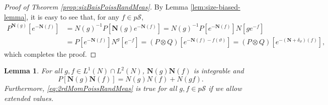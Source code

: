 \documentclass[UTF8]{pkuthss}
\theoremstyle{plain}
\newtheorem{lem}[thm]{Lemma}
\theoremstyle{definition}
\numberwithin{equation}{section}
\begin{document}
\begin{proof}[Proof of Theorem \ref{prop:sizBaisPoissRandMeas}]
	By Lemma \ref{lem:size-biased-lemma}, it is easy to see that, for any $f\in p\mathscr S$,
\begin{align}
	P^{\mathbf N(g)}[e^{-\mathbf N(f)}]
	&= N(g)^{-1} P[\mathbf N(g) e^{-\mathbf N(f)}]
	= N(g)^{-1} P[e^{-\mathbf N(f)}] N[ge^{-f}]\\
	&=  P[e^{-\mathbf N(f)}] N^g[e^{-f}]
	= (P\otimes Q)[e^{-\mathbf N(f) - f(\vartheta)}]
	= (P\otimes Q)[e^{-(\mathbf N + \delta_\vartheta)(f)}],
\end{align}
	which completes the proof.
\end{proof}
\begin{lem}\label{lem:covPoissRandMeas}
	For all $g, f \in L^1(N) \cap L^2(N)$, $\mathbf N(g) \mathbf N(f)$ is integrable and
\begin{equation}\label{eq:2rdMomPoissRandMeas}
	P [\mathbf N(g) \mathbf N(f)]
	= N(g) N(f) + N(g f).
\end{equation}
	Furthermore, \eqref{eq:2rdMomPoissRandMeas} is true for all $g,f\in p\mathscr S$ if we allow extended values.
\end{lem}
\end{document}
